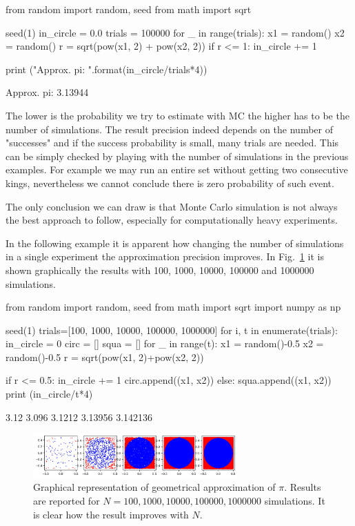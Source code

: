 \begin{ipython}
from random import random, seed
from math import sqrt

seed(1)
in_circle = 0.0
trials = 100000
for _ in range(trials):
    x1 = random()
    x2 = random()
    r = sqrt(pow(x1, 2) + pow(x2, 2))
    if r <= 1:
        in_circle += 1

print ("Approx. pi: {}".format(in_circle/trials*4))
\end{ipython}
\begin{ioutput}
Approx. pi: 3.13944
\end{ioutput}

The lower is the probability we try to estimate with MC the higher has to be the number of simulations. 
The result precision indeed depends on the number of "successes" and if the success probability is small, many trials are needed. This can be simply checked by playing with the number of simulations in the previous examples. For example we may run an entire set without getting two consecutive kings, nevertheless we cannot conclude there is zero probability of such event.

The only conclusion we can draw is that Monte Carlo simulation is not always the best approach to follow, especially for computationally heavy experiments.

In the following example it is apparent how changing the number of simulations in a single experiment the approximation precision improves. In Fig.~\ref{fig:circle_approx} it is shown graphically the results with 100, 1000, 10000, 100000 and 1000000 simulations.

\begin{ipython}
from random import random, seed
from math import sqrt
import numpy as np

seed(1)
trials=[100, 1000, 10000, 100000, 1000000]
for i, t in enumerate(trials):
    in_circle = 0
    circ = []
    squa = []
    for _ in range(t):
        x1 = random()-0.5
        x2 = random()-0.5
        r = sqrt(pow(x1, 2)+pow(x2, 2))

        if r <= 0.5:
            in_circle += 1
            circ.append((x1, x2))
        else:
            squa.append((x1, x2))
    print (in_circle/t*4)
\end{ipython}
\begin{ioutput}
3.12
3.096
3.1212
3.13956
3.142136
\end{ioutput}

\begin{figure}[htb]
\centering
\includegraphics[width=0.7\textwidth]{figures/mc_vs_n_experiments}
\caption{Graphical representation of geometrical approximation of $\pi$. Results are reported for $N = 100, 1000, 10000, 100000, 1000000$ simulations. It is clear how the result improves with $N$.}
\label{fig:circle_approx}
\end{figure}

